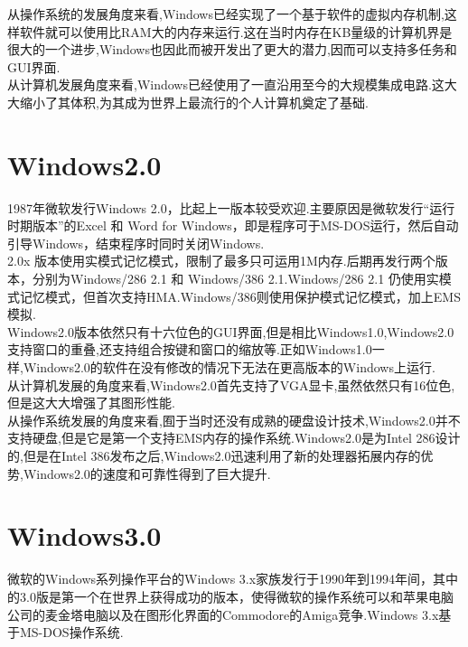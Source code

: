 \documentclass[a4paper,12pt,notitlepage]{article}
\begin{document}
	从操作系统的发展角度来看,Windows已经实现了一个基于软件的虚拟内存机制,这样软件就可以使用比RAM大的内存来运行.这在当时内存在KB量级的计算机界是很大的一个进步,Windows也因此而被开发出了更大的潜力,因而可以支持多任务和GUI界面. \\
	
	从计算机发展角度来看,Windows已经使用了一直沿用至今的大规模集成电路.这大大缩小了其体积,为其成为世界上最流行的个人计算机奠定了基础. \\
	
\section{Windows2.0}

	1987年微软发行Windows 2.0，比起上一版本较受欢迎.主要原因是微软发行“运行时期版本”的Excel 和 Word for Windows，即是程序可于MS-DOS运行，然后自动引导Windows，结束程序时同时关闭Windows. \\
	
	2.0x 版本使用实模式记忆模式，限制了最多只可运用1M内存.后期再发行两个版本，分别为Windows/286 2.1 和 Windows/386 2.1.Windows/286 2.1 仍使用实模式记忆模式，但首次支持HMA.Windows/386则使用保护模式记忆模式，加上EMS模拟. \\
	
	Windows2.0版本依然只有十六位色的GUI界面,但是相比Windows1.0,Windows2.0支持窗口的重叠,还支持组合按键和窗口的缩放等.正如Windows1.0一样,Windows2.0的软件在没有修改的情况下无法在更高版本的Windows上运行. \\
	
	从计算机发展的角度来看,Windows2.0首先支持了VGA显卡,虽然依然只有16位色,但是这大大增强了其图形性能. \\
	
	从操作系统发展的角度来看,囿于当时还没有成熟的硬盘设计技术,Windows2.0并不支持硬盘,但是它是第一个支持EMS内存的操作系统.Windows2.0是为Intel 286设计的,但是在Intel 386发布之后,Windows2.0迅速利用了新的处理器拓展内存的优势,Windows2.0的速度和可靠性得到了巨大提升. \\
	
\section{Windows3.0}

	微软的Windows系列操作平台的Windows 3.x家族发行于1990年到1994年间，其中的3.0版是第一个在世界上获得成功的版本，使得微软的操作系统可以和苹果电脑公司的麦金塔电脑以及在图形化界面的Commodore的Amiga竞争.Windows 3.x基于MS-DOS操作系统. \\
	
\end{document}

